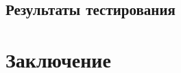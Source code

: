 \documentclass{matmex-diploma}
\begin{document}
    \subsection{Результаты тестирования}
    
\section*{Заключение}
    
    
    
    
    
    




\end{document}
